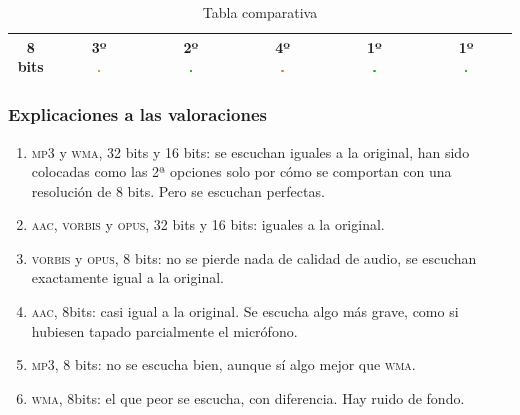 \documentclass[11pt,a4paper]{article}
\begin{document}
\begin{table}[H]
\begin{tabular}{|c|c|c|c|c|c|}
 8 bits & \makecell{3º\\ \includegraphics[width=0.03\textwidth]{m.png}} & \makecell{2º\\ \includegraphics[width=0.03\textwidth]{mb.png}} & \makecell{4º\\ \includegraphics[width=0.03\textwidth]{m.png}} & \makecell{1º\\ \includegraphics[width=0.03\textwidth]{mb.png}} & \makecell{1º\\ \includegraphics[width=0.03\textwidth]{mb.png}} \\ \hline
\end{tabular}
\caption{Tabla comparativa}
\label{my-label}
\end{table}

\subsubsection{Explicaciones a las valoraciones}
\begin{enumerate}
	\item \textsc{mp3} y \textsc{wma}, 32 bits y 16 bits: se escuchan iguales a la original, han sido colocadas como las 2ª opciones solo por cómo se comportan con una resolución de 8 bits. Pero se escuchan perfectas.
	\item \textsc{aac, vorbis} y \textsc{opus}, 32 bits y 16 bits: iguales a la original.
	\item \textsc{vorbis} y \textsc{opus}, 8 bits: no se pierde nada de calidad de audio, se escuchan exactamente igual a la original.
	\item \textsc{aac}, 8bits: casi igual a la original. Se escucha algo más grave, como si hubiesen tapado parcialmente el micrófono.
	\item \textsc{mp3}, 8 bits: no se escucha bien, aunque sí algo mejor que \textsc{wma}.
	\item \textsc{wma}, 8bits: el que peor se escucha, con diferencia. Hay ruido de fondo.
\end{enumerate}
\end{document}
